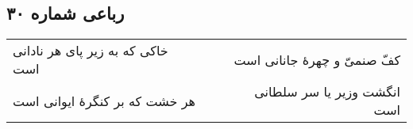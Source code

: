 \begin{center}
\section*{رباعی شماره ۳۰}
\label{sec:sh030}
\begin{longtable}{l p{0.5cm} r}
خاکی که به زیر پای هر نادانی است
&&
کفّ صنمیّ و چهرهٔ جانانی است
\\
هر خشت که بر کنگرهٔ ایوانی است
&&
انگشت وزیر یا سر سلطانی است
\\
\end{longtable}
\end{center}
